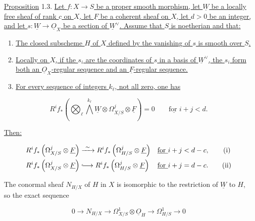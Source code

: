 
\underline{Proposition} 1.3. \underline{Let $f:X\to S$ be a proper smooth
morphism, let $\underline W$ be a locally free sheaf of rank $c$ on $X$,
let $\underline F$ be a coherent sheaf on $X$, let $d>0$ be an integer,
and let $s:\underline W\to\underline O_X$ be a section of
$\underline W^\vee$.  Assume that $S$ is noetherian and that:}

\begin{enumerate}[label=(\alph*),leftmargin=2.4em]
\item \underline{The closed subscheme $H$ of $X$ defined by the vanishing
of $s$ is smooth over $S$.}

\item \underline{Locally on $X$, if the $s_i$ are the coordinates of $s$
in a basis of $\underline W^\vee$, the $s_i$ form both an
$\underline O_X$-regular sequence and an $\underline F$-regular sequence.}

\item \underline{For every sequence of integers $k_\ell$, not all zero,
one has}
\end{enumerate}

\begin{equation*}
R^if_*\left(\bigotimes_\ell\bigwedge^{k_\ell}\underline W
\otimes\Omega^j_{X/S}\otimes\underline F\right)=0
\qquad\underline{\text{for }}i+j<d.
\end{equation*}

\underline{Then:}

\begin{align*}
R^if_*\left(\Omega^j_{X/S}\otimes\underline F\right)
&\xrightarrow{\ \sim\ }
R^if_*\left(\Omega^j_{H/S}\otimes\underline F\right)
&&\underline{\text{for }}i+j<d-c, \tag{i}\\
R^if_*\left(\Omega^j_{X/S}\otimes\underline F\right)
&\lhook\joinrel\longrightarrow
R^if_*\left(\Omega^j_{H/S}\otimes\underline F\right)
&&\underline{\text{for }}i+j=d-c. \tag{ii}
\end{align*}

The conormal sheaf $N_{H/X}$ of $H$ in $X$ is isomorphic to the restriction
of $\underline W$ to $H$, so the exact sequence

\begin{equation}\tag{1.3.1}
0\longrightarrow N_{H/X}\longrightarrow
\Omega^1_{X/S}\otimes\underline O_H\longrightarrow
\Omega^1_{H/S}\longrightarrow0
\end{equation}

